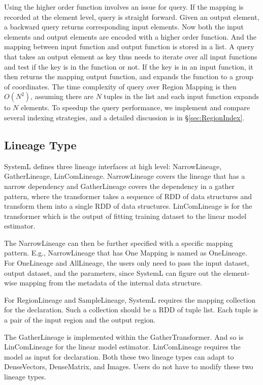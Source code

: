 \documentclass{sig-alternate}
\begin{document}
Using the higher order function involves an issue for query. If the mapping is recorded at the element level, query is straight forward.
Given an output element, a backward query returns corresponding input elements.
Now both the input elements and output elements are encoded with a higher order function. 
And the mapping between input function and output function is stored in a list. 
A query that takes an output element as key thus needs to iterate over all input functions and test if the key is in the function or not.
If the key is in an input function, it then returns the mapping output function, and expands the function to a group of coordinates.
The time complexity of query over Region Mapping is then $O(N^2)$, assuming there are $N$ tuples in the list and each input function expands to $N$ elements.
To speedup the query performance, we implement and compare several indexing strategies, and a detailed discussion is in \S\ref{sec:RegionIndex}.

\subsection{Lineage Type}
SystemL defines three lineage interfaces at high level: NarrowLineage, GatherLineage, LinComLineage. 
NarrowLineage covers the lineage that has a narrow dependency and GatherLineage covers the dependency in a gather pattern, where the transformer takes a sequence of RDD of data structures and transform them into a single RDD of data structures. 
LinComLineage is for the transformer which is the output of fitting training dataset to the linear model estimator.

The NarrowLineage can then be further specified with a specific mapping pattern. E.g., NarrowLineage that has One Mapping is named as OneLineage.
For OneLineage and AllLineage, the users only need to pass the input dataset, output dataset, and the parameters, since SystemL can figure out the element-wise mapping from the metadata of the internal data structure.

For RegionLineage and SampleLineage, SystemL requires the mapping collection for the declaration. 
Such a collection should be a RDD of tuple list. 
Each tuple is a pair of the input region and the output region.

The GatherLineage is implemented within the GatherTransformer.
And so is LinComLineage for the linear model estimator. LinComLineage requires the model as input for declaration.
Both these two lineage types can adapt to DenseVectors, DenseMatrix, and Images. 
Users do not have to modify these two lineage types. 
\end{document}
